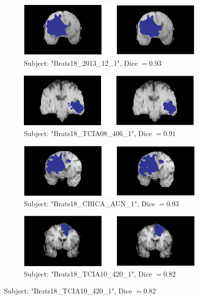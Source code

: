 \documentclass{article}
\begin{document}
\begin{figure}[!ht]
\centering

\begin{subfigure}[b]{0.5\textwidth}		
\includegraphics[width=\textwidth]{Brats18_2013_12_1_108}
\caption{Subject: "Brats18\_2013\_12\_1", Dice $= 0.93$}
\end{subfigure}

\begin{subfigure}[b]{0.5\textwidth}
\includegraphics[width=\textwidth]{Brats18_TCIA08_406_1_127}
\caption{Subject: "Brats18\_TCIA08\_406\_1", Dice $= 0.91$}
\end{subfigure}

\begin{subfigure}[b]{0.5\textwidth}
\includegraphics[width=\textwidth]{Brats18_CBICA_AUN_1_111}
\caption{Subject: "Brats18\_CBICA\_AUN\_1", Dice $= 0.93$}
\end{subfigure}

\begin{subfigure}[b]{0.5\textwidth}
\includegraphics[width=\textwidth]{Brats18_TCIA10_420_1_97}
\caption{Subject: "Brats18\_TCIA10\_420\_1", Dice $= 0.82$}
\end{subfigure}


\end{figure}
\end{document}
